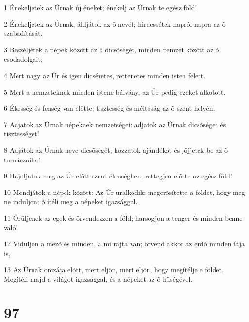 \par 1 Énekeljetek az Úrnak új éneket; énekelj az Úrnak te egész föld!
\par 2 Énekeljetek az Úrnak, áldjátok az õ nevét; hirdessétek napról-napra az õ szabadítását.
\par 3 Beszéljétek a népek között az õ dicsõségét, minden nemzet között az õ csodadolgait;
\par 4 Mert nagy az Úr és igen dicséretes, rettenetes minden isten felett.
\par 5 Mert a nemzeteknek minden istene bálvány, az Úr pedig egeket alkotott.
\par 6 Ékesség és fenség van elõtte; tisztesség és méltóság az õ szent helyén.
\par 7 Adjatok az Úrnak népeknek nemzetségei: adjatok az Úrnak dicsõséget és tisztességet!
\par 8 Adjátok az Úrnak neve dicsõségét; hozzatok ajándékot és jõjjetek be az õ tornáczaiba!
\par 9 Hajoljatok meg az Úr elõtt szent ékességben; rettegjen elõtte az egész föld!
\par 10 Mondjátok a népek között: Az Úr uralkodik; megerõsítette a földet, hogy meg ne induljon; õ ítéli meg a népeket igazsággal.
\par 11 Örüljenek az egek és örvendezzen a föld; harsogjon a tenger és minden benne való!
\par 12 Viduljon a mezõ és minden, a mi rajta van; örvend akkor az erdõ minden fája is,
\par 13 Az Úrnak orczája elõtt, mert eljön, mert eljön, hogy megítélje e földet. Megítéli majd a világot igazsággal, és a népeket az õ hûségével.

\chapter{97}

